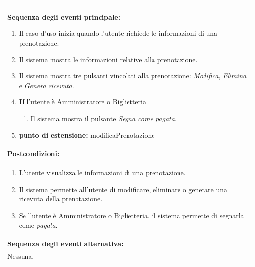 \documentclass{article}
\begin{document}
\begin{table}[H]
\begin{tabular}{|p{\linewidth}|}
                        \vspace{-5pt} \\
                        \hline
                        \textbf{Sequenza degli eventi principale:}
                        \begin{enumerate}
                            \item Il caso d'uso inizia quando l'utente richiede le informazioni di una prenotazione.
                            \item Il sistema mostra le informazioni relative alla prenotazione.
                            \item Il sistema mostra tre pulsanti vincolati alla prenotazione: \emph{Modifica}, \emph{Elimina} e \emph{Genera ricevuta}.
                            \item \textbf{If} l'utente è Amministratore o Biglietteria
                            \begin{enumerate}
                                \item Il sistema mostra il pulsante \emph{Segna come pagata}.
                            \end{enumerate}
                            \item[] \textbf{punto di estensione:} modificaPrenotazione
                        \end{enumerate} \\
                        \hline
                        \cellcolor{gray!20}
                        \textbf{Postcondizioni:} \\
                        \cellcolor{gray!20}
                        \begin{minipage}{\linewidth}
                            \begin{enumerate}
                                \item L'utente visualizza le informazioni di una prenotazione.
                                \item Il sistema permette all'utente di modificare, eliminare o generare una ricevuta della prenotazione.  %
                                \item Se l'utente è Amministratore o Biglietteria, il sistema permette di segnarla come \emph{pagata}.
                            \end{enumerate}
                        \end{minipage}
                        \vspace{0pt} \\
                        \hline
                        \textbf{Sequenza degli eventi alternativa:} \\
                        Nessuna. \\
                        \hline
                    \end{tabular}
                \end{table}
\end{document}
